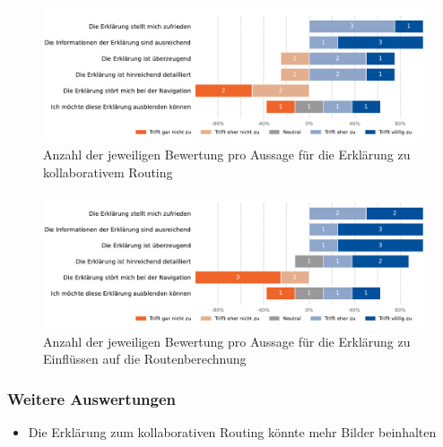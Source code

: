 \begin{figure}[htb!]
    \centering
    \includegraphics[width=\textwidth]{contents/06_model_evaluation/02_evaluation/res/qualitativeFeedback-01_collaborative_routing_short.pdf}
    \caption{Anzahl der jeweiligen Bewertung pro Aussage für die Erklärung zu kollaborativem Routing}
    \label{fig:01_collaborative_routing_short}
\end{figure}

\begin{figure}[htb!]
    \centering
    \includegraphics[width=\textwidth]{contents/06_model_evaluation/02_evaluation/res/qualitativeFeedback-02_collaborative_algorithm_short.pdf}
    \caption{Anzahl der jeweiligen Bewertung pro Aussage für die Erklärung zu Einflüssen auf die Routenberechnung}
    \label{fig:02_collaborative_algorithm_short}
\end{figure}

\subsubsection{Weitere Auswertungen}

\begin{itemize}
    \item Die Erklärung zum kollaborativen Routing könnte mehr Bilder beinhalten
\end{itemize}